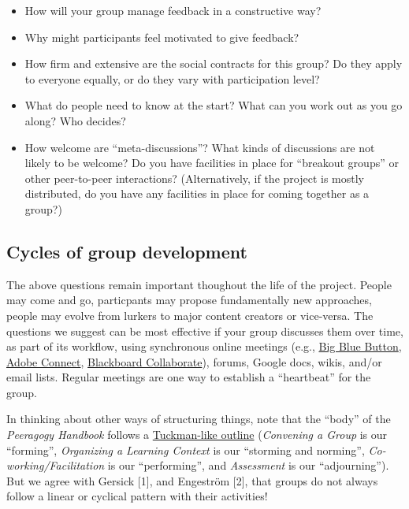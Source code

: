 \begin{itemize}
\item
  How will your group manage feedback in a constructive way?
\item
  Why might participants feel motivated to give feedback?
\item
  How firm and extensive are the social contracts for this group? Do
  they apply to everyone equally, or do they vary with participation
  level?
\item
  What do people need to know at the start? What can you work out as you
  go along? Who decides?
\item
  How welcome are ``meta-discussions''? What kinds of discussions are
  not likely to be welcome? Do you have facilities in place for
  ``breakout groups'' or other peer-to-peer interactions?
  (Alternatively, if the project is mostly distributed, do you have any
  facilities in place for coming together as a group?)
\end{itemize}
\subsection{Cycles of group development}

The above questions remain important thoughout the life of the project.
People may come and go, particpants may propose fundamentally new
approaches, people may evolve from lurkers to major content creators or
vice-versa. The questions we suggest can be most effective if your group
discusses them over time, as part of its workflow, using synchronous
online meetings (e.g., \href{http://www.bigbluebutton.org/}{Big Blue
Button},
\href{http://success.adobe.com/en/na/sem/products/connect/1109\_6011\_connect\_webinars.html?sdid=IEASO\&skwcid=TC\textbar{}22191\textbar{}adobe\%20connect\textbar{}\textbar{}S\textbar{}e\textbar{}5894715262}{Adobe
Connect},
\href{http://www.blackboard.com/platforms/collaborate/overview.aspx}{Blackboard
Collaborate}), forums, Google docs, wikis, and/or email lists. Regular
meetings are one way to establish a ``heartbeat'' for the group.

In thinking about other ways of structuring things, note that the
``body'' of the \emph{Peeragogy Handbook} follows a
\href{http://en.wikipedia.org/wiki/Forming-storming-norming-performing}{Tuckman-like
outline} (\emph{Convening a Group} is our ``forming'', \emph{Organizing
a Learning Context} is our ``storming and norming'',
\emph{Co-working/Facilitation} is our ``performing'', and
\emph{Assessment} is our ``adjourning''). But we agree with Gersick
{[}1{]}, and Engeström {[}2{]}, that groups do not always follow a
linear or cyclical pattern with their activities!


